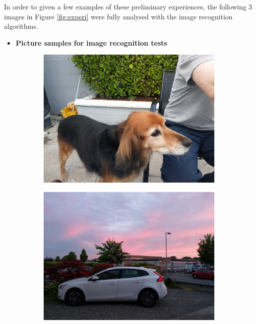  In order to given a few examples of these preliminary experiences, the following 3 images in Figure \ref{fig:experi} were fully analysed with the image recognition algorithms.
\newpage
\begin{itemize}
  \item \textbf{Picture samples for image recognition tests}
\end{itemize}

  \begin{figure}[H]
    \centering
    \captionsetup{justification=centering}
  
    \begin{subfigure}{0.35\textwidth}
    \includegraphics[width=\textwidth]{Sections/4InitialWork/4_images/run1_pic.jpg}
    \caption{} 
    \end{subfigure}
    \begin{subfigure}{0.35\textwidth}
    \includegraphics[width=\textwidth]{Sections/4InitialWork/4_images/run3_pic.jpg}

\end{subfigure}
\end{figure}
